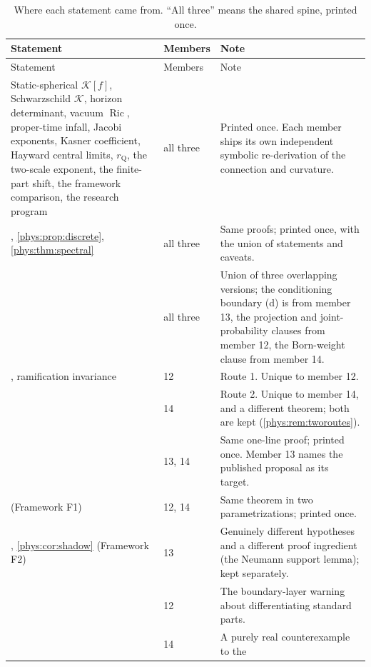 \documentclass[11pt,letterpaper]{article}
\numberwithin{equation}{section}
\theoremstyle{definition}
\theoremstyle{remark}
\newcommand{\Kret}{\mathcal K}
\DeclareMathOperator{\Ric}{Ric}
\begin{document}
\begin{longtable}{@{}L{0.30\textwidth}L{0.11\textwidth}L{0.52\textwidth}@{}}
\caption{Where each statement came from. ``All three'' means the shared spine,
printed once.}
\label{phys:tab:provenance}\\
\toprule
Statement & Members & Note \\
\midrule
\endfirsthead
\toprule
Statement & Members & Note \\
\midrule
\endhead
\bottomrule
\endfoot
Static-spherical $\Kret[f]$, Schwarzschild $\Kret$, horizon determinant,
vacuum $\Ric$, proper-time infall, Jacobi exponents, Kasner coefficient,
Hayward central limits, $r_{\mathrm Q}$, the two-scale exponent, the
finite-part shift, the framework comparison, the research program &
all three & Printed once. Each member ships its own independent symbolic
re-derivation of the connection and curvature. \\
\addlinespace
{}, \cref{phys:prop:discrete},
\cref{phys:thm:spectral} & all three & Same proofs; printed once, with the
union of statements and caveats. \\
\addlinespace
{} & all three & Union of three overlapping
versions; the conditioning boundary (d) is from member 13, the projection and
joint-probability clauses from member 12, the Born-weight clause from member
14. \\
\addlinespace
{}, ramification invariance &
12 & Route 1. Unique to member 12. \\
\addlinespace
{} & 14 & Route 2. Unique to member 14, and a different
theorem; both are kept (\cref{phys:rem:tworoutes}). \\
\addlinespace
{} & 13, 14 & Same one-line proof; printed once.
Member 13 names the published proposal as its target. \\
\addlinespace
{} (Framework F1) & 12, 14 & Same theorem in two
parametrizations; printed once. \\
\addlinespace
{}, \cref{phys:cor:shadow} (Framework F2) & 13 &
Genuinely different hypotheses and a different proof ingredient (the Neumann
support lemma); kept separately. \\
\addlinespace
{} & 12 & The boundary-layer warning about
differentiating standard parts. \\
\addlinespace
{} & 14 & A purely real counterexample to the

\end{longtable}
\end{document}

